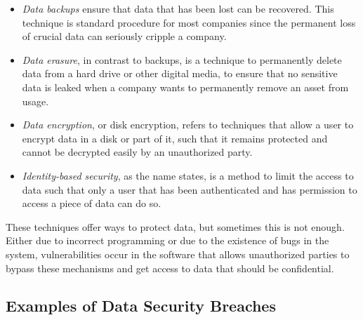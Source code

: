 \begin{itemize}
    \setlength\itemsep{1em}

    \item \textit{Data backups} ensure that data that has been lost can be recovered. This technique is standard procedure for most companies since the permanent loss of crucial data can seriously cripple a company.

    \item \textit{Data erasure}, in contrast to backups, is a technique to permanently delete data from a hard drive or other digital media, to ensure that no sensitive data is leaked when a company wants to permanently remove an asset from usage.

    \item \textit{Data encryption}, or disk encryption, refers to techniques that allow a user to encrypt data in a disk or part of it, such that it remains protected and cannot be decrypted easily by an unauthorized party.

    \item \textit{Identity-based security}, as the name states, is a method to limit the access to data such that only a user that has been authenticated and has permission to access a piece of data can do so.


\end{itemize}


These techniques offer ways to protect data, but sometimes this is not enough. Either due to incorrect programming or due to the existence of bugs in the system, vulnerabilities occur in the software that allows unauthorized parties to bypass these mechanisms and get access to data that should be confidential.



\subsection{Examples of Data Security Breaches} 
\label{ssec:ExamplesDataSecurityBreaches}


